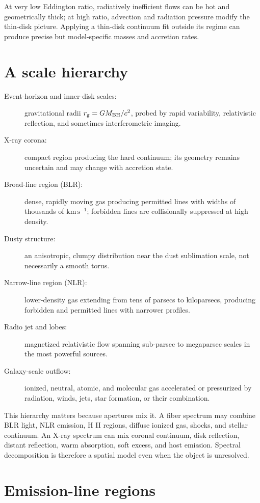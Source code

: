 At very low Eddington ratio, radiatively inefficient flows can be hot and
geometrically thick; at high ratio, advection and radiation pressure modify
the thin-disk picture. Applying a thin-disk continuum fit outside its regime
can produce precise but model-specific masses and accretion rates.

\section{A scale hierarchy}

\begin{description}
 \item[Event-horizon and inner-disk scales:] gravitational radii
 $r_{\rm g}=GM_{\rm BH}/c^2$, probed by rapid variability, relativistic
 reflection, and sometimes interferometric imaging.
 \item[X-ray corona:] compact region producing the hard continuum; its
 geometry remains uncertain and may change with accretion state.
 \item[Broad-line region (BLR):] dense, rapidly moving gas producing permitted
 lines with widths of thousands of $\mathrm{km\,s^{-1}}$; forbidden lines are
 collisionally suppressed at high density.
 \item[Dusty structure:] an anisotropic, clumpy distribution near the dust
 sublimation scale, not necessarily a smooth torus.
 \item[Narrow-line region (NLR):] lower-density gas extending from tens of
 parsecs to kiloparsecs, producing forbidden and permitted lines with
 narrower profiles.
 \item[Radio jet and lobes:] magnetized relativistic flow spanning sub-parsec
 to megaparsec scales in the most powerful sources.
 \item[Galaxy-scale outflow:] ionized, neutral, atomic, and molecular gas
 accelerated or pressurized by radiation, winds, jets, star formation, or
 their combination.
\end{description}

This hierarchy matters because apertures mix it. A fiber spectrum may combine
BLR light, NLR emission, H II regions, diffuse ionized gas, shocks, and stellar
continuum. An X-ray spectrum can mix coronal continuum, disk reflection,
distant reflection, warm absorption, soft excess, and host emission.
Spectral decomposition is therefore a spatial model even when the object is
unresolved.

\section{Emission-line regions}


